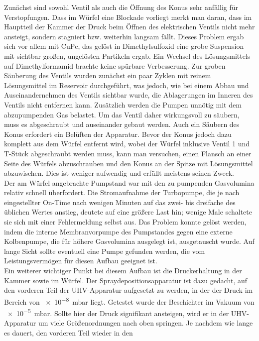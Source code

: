 Zunächst sind sowohl Ventil als auch die Öffnung des Konus sehr anfällig für Verstopfungen. Dass im
Würfel eine Blockade vorliegt merkt man daran, dass im Hauptteil der Kammer der
Druck beim Öffnen des elektrischen Ventils nicht mehr ansteigt, sondern stagniert bzw. weiterhin
langsam fällt. Dieses Problem ergab sich vor allem mit CuPc, das gelöst in Dimethylsulfoxid eine
grobe Suspension mit sichtbar großen, ungelösten Partikeln ergab. Ein Wechsel des Lösungsmittels auf
Dimethylformamid brachte keine spürbare Verbesserung. Zur groben Säuberung des Ventils wurden
zunächst ein paar Zyklen mit reinem Lösungsmittel im Reservoir durchgeführt, was jedoch, wie bei
einem Abbau und Auseinandernehmen des Ventils sichtbar wurde, die Ablagerungen im Inneren des
Ventils nicht entfernen kann. Zusätzlich werden die Pumpen unnötig mit dem abzupumpenden Gas
belastet. Um das Ventil daher wirkungsvoll zu säubern, muss es abgeschraubt und auseinander gebaut
werden. Auch ein Säubern des Konus erfordert ein Belüften der Apparatur. Bevor der Konus jedoch
dazu komplett aus dem Würfel entfernt wird, wobei der Würfel inklusive Ventil 1 und T-Stück
abgeschraubt werden muss, kann man versuchen, einen Flansch an einer Seite des Würfels abzuschrauben
und den Konus an der Spitze mit Lösungsmittel abzuwischen. Dies ist weniger aufwendig und
erfüllt meistens seinen Zweck.
\\
Der am Würfel angebrachte Pumpstand war mit den zu pumpenden Gasvolumina relativ schnell
überfordert. Die Stromaufnahme der Turbopumpe, die je nach eingestellter On-Time nach
wenigen Minuten auf das zwei- bis dreifache des üblichen Wertes anstieg, deutete auf eine größere
Last hin; wenige Male schaltete sie sich mit einer Fehlermeldung selbst aus. Das Problem konnte gelöst werden,
indem die interne Membranvorpumpe des Pumpstandes gegen eine externe Kolbenpumpe, die für höhere
Gasvolumina ausgelegt ist, ausgetauscht wurde.
Auf lange Sicht sollte eventuell eine Pumpe gefunden werden, die vom Leistungsvermögen für diesen
Aufbau geeignet ist.
\\
Ein weiterer wichtiger Punkt bei diesem Aufbau ist die Druckerhaltung in der Kammer sowie im Würfel.
Der Spraydepositionsapparatur ist dazu gedacht, auf den vorderen Teil der UHV-Apparatur aufgesetzt
zu werden, in der der Druck im Bereich von \SI{e-8}{mbar} liegt. Getestet wurde der Beschichter im Vakuum von
\SI{e-5}{mbar}. Sollte hier der Druck signifikant ansteigen, wird er in der UHV-Apparatur um viele
Größenordnungen nach oben springen. Je nachdem wie lange es dauert, den vorderen Teil wieder in den
